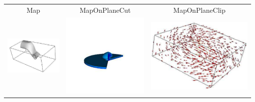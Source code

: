\begin{table}[ht]
\begin{tabular}{c c c}
Map & MapOnPlaneCut & MapOnPlaneClip \\ 
\includegraphics[width=\thumbnailwidth]{figures/MapOnScalarClip} & 
\includegraphics[width=\thumbnailwidth]{figures/MapOnScalarClipWithRotation} & 
\includegraphics[width=\thumbnailwidth]{figures/Velocity} \\ 

\end{tabular}
\end{table}
